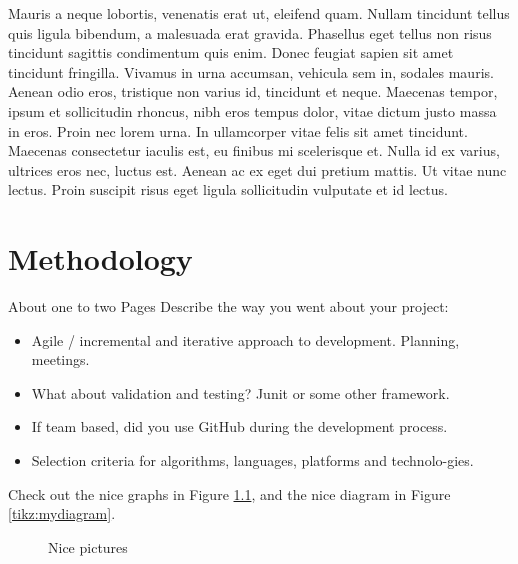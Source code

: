 Mauris a neque lobortis, venenatis erat ut, eleifend quam. Nullam tincidunt tellus quis ligula bibendum, a malesuada erat gravida. Phasellus eget tellus non risus tincidunt sagittis condimentum quis enim. Donec feugiat sapien sit amet tincidunt fringilla. Vivamus in urna accumsan, vehicula sem in, sodales mauris. Aenean odio eros, tristique non varius id, tincidunt et neque. Maecenas tempor, ipsum et sollicitudin rhoncus, nibh eros tempus dolor, vitae dictum justo massa in eros. Proin nec lorem urna. In ullamcorper vitae felis sit amet tincidunt. Maecenas consectetur iaculis est, eu finibus mi scelerisque et. Nulla id ex varius, ultrices eros nec, luctus est. Aenean ac ex eget dui pretium mattis. Ut vitae nunc lectus. Proin suscipit risus eget ligula sollicitudin vulputate et id lectus.


\chapter{Methodology}	%
About one to two Pages
Describe the way you went about your project:
\begin{itemize}
\item Agile / incremental and iterative approach to development. Planning, meetings.
\item What about validation and testing? Junit or some other framework.
\item If team based, did you use GitHub during the development process.
\item Selection criteria for algorithms, languages, platforms and technolo-gies.
\end{itemize}

Check out the nice graphs in Figure \ref{tikz:graphs}, and the nice diagram in Figure \ref{tikz:mydiagram}.

\begin{figure}
	\centering
	\hspace{1.5cm}
	\caption{Nice pictures}
	\label{tikz:graphs}
\end{figure}


